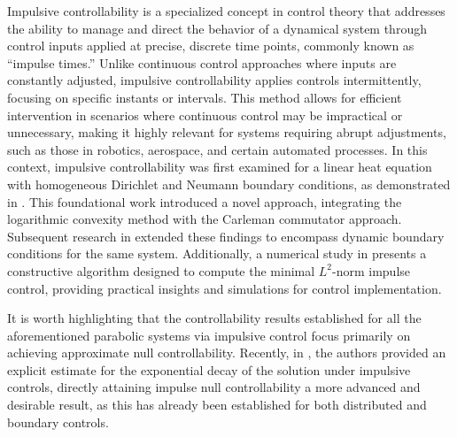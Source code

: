 \documentclass[sn-mathphys]{sn-jnl}
\begin{document}
Impulsive controllability is a specialized concept in control theory that addresses the ability to manage and direct the behavior of a dynamical system through control inputs applied at precise, discrete time points, commonly known as “impulse times.” Unlike continuous control approaches where inputs are constantly adjusted, impulsive controllability applies controls intermittently, focusing on specific instants or intervals. This method allows for efficient intervention in scenarios where continuous control may be impractical or unnecessary, making it highly relevant for systems requiring abrupt adjustments, such as those in robotics, aerospace, and certain automated processes. In this context, impulsive controllability was first examined for a linear heat equation with homogeneous Dirichlet and Neumann boundary conditions, as demonstrated in \cite{pkm, RBKDP2022}. This foundational work introduced a novel approach, integrating the logarithmic convexity method with the Carleman commutator approach. Subsequent research in \citep{CGMZ'22} extended these findings to encompass dynamic boundary conditions for the same system. Additionally, a numerical study in \citep{CGMZ'221} presents a constructive algorithm designed to compute the minimal \( L^2 \)-norm impulse control, providing practical insights and simulations for control implementation. 

It is worth highlighting that the controllability results established for all the aforementioned parabolic systems via impulsive control focus primarily on achieving approximate null controllability. Recently, in \cite{CGMZ2023'}, the authors provided an explicit estimate for the exponential decay of the solution under impulsive controls, directly attaining impulse null controllability a more advanced and desirable result, as this has already been established for both distributed and boundary controls.
\end{document}
